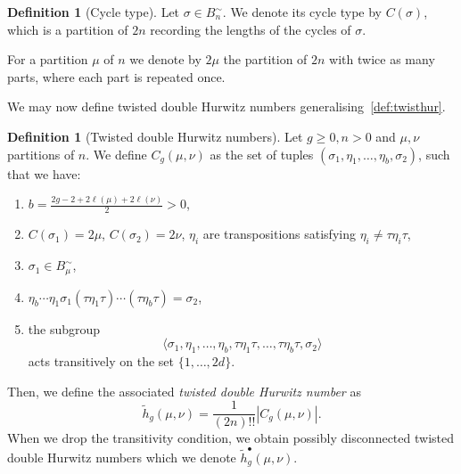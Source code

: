 \documentclass[11pt]{article}
\theoremstyle{definition}
\newtheorem{defi}[theo]{Definition}
\numberwithin{equation}{section}
\begin{document}
\begin{defi}[Cycle type]
Let $\sigma\in B^{\sim}_n$. We denote its cycle type by $C(\sigma)$, which is a partition of $2n$ recording the lengths of the cycles of $\sigma$.
\end{defi}

For a partition $\mu$ of $n$ we denote by $2\mu$ the partition of $2n$ with twice as many parts, where each part is repeated once.

We may now define twisted double Hurwitz numbers generalising~\cref{def:twisthur}.

\begin{defi}[Twisted double Hurwitz numbers]
\label{def:twisthurdou}
Let $g\ge0,n>0$ and $\mu,\nu$ partitions of $n$. We define $C_g(\mu,\nu)$ as the set of tuples $(\sigma_1,\eta_1,\dots,\eta_b,\sigma_2)$,
such that we have:
\begin{enumerate}
    \item $b=\frac{2g-2+2\ell(\mu)+2\ell(\nu)}{2}>0$,
    \item $C(\sigma_1)=2\mu$, $C(\sigma_2)=2\nu$, $\eta_i$ are transpositions satisfying $\eta_i\neq \tau \eta_i \tau$,
    \item $\sigma_1\in B^\sim_\mu$,
    \item $\eta_b\cdots\eta_1\sigma_1(\tau\eta_1\tau)\cdots(\tau\eta_b\tau)=\sigma_2$,
    \item the subgroup 
    $$\langle \sigma_1,\eta_1,\ldots,\eta_{b},\tau \eta_1\tau, \ldots,\tau\eta_b\tau,\sigma_2\rangle$$ acts transitively on the set $\{1,\ldots,2d\}$.
\end{enumerate}
Then, we define the associated \textit{twisted double Hurwitz number} as
\begin{equation*}
    \tilde{h}_{g}(\mu,\nu)=\frac{1}{(2n)!!}|C_g(\mu,\nu)|.
\end{equation*}
When we drop the transitivity condition, we obtain possibly disconnected twisted double Hurwitz numbers which we denote $\tilde{h}_{g}^\bullet(\mu,\nu)$.
\end{defi}
\end{document}
